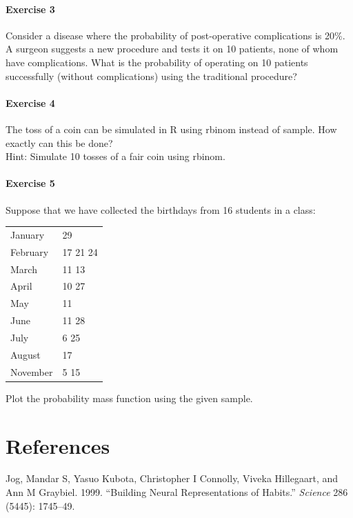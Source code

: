 \documentclass[
]{article}
\newlength{\cslhangindent}
\newlength{\cslentryspacingunit} %
\newenvironment{CSLReferences}[2] %
 {%
  \setlength{\parindent}{0pt}
  \ifodd #1
  \let\oldpar\par
  \def\par{\hangindent=\cslhangindent\oldpar}
  \fi
  \setlength{\parskip}{#2\cslentryspacingunit}
 }%
 {}
\begin{document}
\hypertarget{exercise-3}{%
\paragraph{Exercise 3}\label{exercise-3}}

Consider a disease where the probability of post-operative complications
is 20\%. A surgeon suggests a new procedure and tests it on 10 patients,
none of whom have complications. What is the probability of operating on
10 patients successfully (without complications) using the traditional
procedure?

\hypertarget{exercise-4}{%
\paragraph{Exercise 4}\label{exercise-4}}

The toss of a coin can be simulated in R using rbinom instead of sample.
How exactly can this be done?\\
Hint: Simulate 10 tosses of a fair coin using rbinom.

\hypertarget{exercise-5}{%
\paragraph{Exercise 5}\label{exercise-5}}

Suppose that we have collected the birthdays from 16 students in a
class:

\begin{longtable}[]{@{}ll@{}}
\toprule\noalign{}
\endhead
\bottomrule\noalign{}
\endlastfoot
January & 29 \\
February & 17 21 24 \\
March & 11 13 \\
April & 10 27 \\
May & 11 \\
June & 11 28 \\
July & 6 25 \\
August & 17 \\
November & 5 15 \\
\end{longtable}

Plot the probability mass function using the given sample.

\hypertarget{references}{%
\section*{References}\label{references}}

\hypertarget{refs}{}
\begin{CSLReferences}{1}{0}
\leavevmode{}%
Jog, Mandar S, Yasuo Kubota, Christopher I Connolly, Viveka Hillegaart,
and Ann M Graybiel. 1999. {``Building Neural Representations of
Habits.''} \emph{Science} 286 (5445): 1745--49.

\end{CSLReferences}
\end{document}
